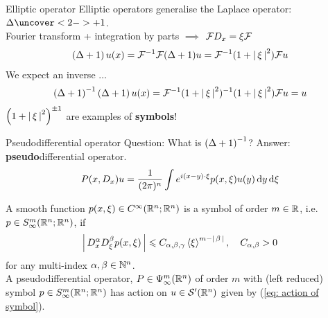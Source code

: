 \documentclass{beamer}
\begin{document}
\begin{frame}{Elliptic operator}
Elliptic operators generalise the Laplace operator: $\Delta \uncover<2->{+1}$. \\
Fourier transform + integration by parts $\implies$ $\F D_x = \xi \F $ 
\begin{align*}
\brac{\Delta + 1} u(x) = \F^{-1} \F (\Delta + 1) u = \F^{-1} (1 + \abs{\xi}^2) \F u 
\end{align*}
We expect an inverse $\dots$ 
\begin{align*}
\brac{\Delta + 1}^{-1} \brac{\Delta + 1} u(x) = \F^{-1} (1 + \abs{\xi}^2)^{-1} (1 + \abs{\xi}^2) \F u = u 
\end{align*}
$\brac{1 + \abs{\xi}^2}^{\pm 1} $ are examples of \textbf{symbols}! 
\end{frame} 

\begin{frame}{Pseudodifferential operator}
Question: What is $\brac{\Delta + 1}^{-1}$? Answer: \textbf{pseudo}differential operator. 
\begin{align}
P(x, D_x) u = \frac{1}{(2\pi)^n} \int e^{i(x - y) \cdot \xi} p(x, \xi) u(y) \d[y] \d[\xi]  \label{eq: action of symbol} 
\end{align}
\begin{definition} A smooth function $p(x, \xi) \in C^\infty(\R^{n}; \R^n)$ is a symbol of order $m \in \R$, i.e. $p \in S^{m}_\infty(\R^{n}; \R^n)$, if
    \begin{align*}
    \abs{D^{\alpha}_x D^\beta_\xi p(x, \xi)} \leq C_{\alpha, \beta, \gamma}  \sym[\xi]^{m - \abs{\beta}}, \quad C_{\alpha, \beta}  > 0
    \end{align*}
    for any multi-index $\alpha, \beta \in \N^n$. \\
    
    A pseudodifferential operator, $P \in \Psi^{m}_{\infty}(\R^n)$ of order $m$ with (left reduced) symbol $p \in S^{m}_\infty(\R^{n}; \R^n)$ has action on $u \in \sch'(\R^n)$ given by (\ref{eq: action of symbol}). 
\end{definition}
\end{frame} 
\end{document}
